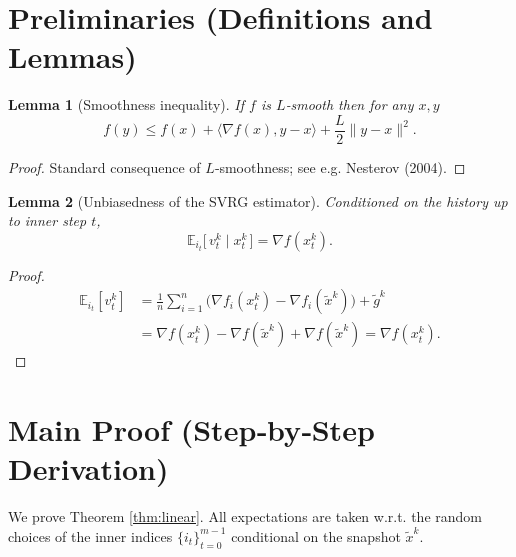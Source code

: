 \documentclass{article}
\newtheorem{lemma}{Lemma}
\begin{document}
\newpage
\section*{Preliminaries (Definitions and Lemmas)}
\begin{lemma}[Smoothness inequality]\label{lem:smooth}
If $f$ is $L$‑smooth then for any $x,y$
\[
f(y)\le f(x)+\langle\nabla f(x),y-x\rangle+\frac{L}{2}\|y-x\|^{2}.
\]
\end{lemma}
\begin{proof}
Standard consequence of $L$‑smoothness; see e.g. Nesterov (2004). \qedhere
\end{proof}

\begin{lemma}[Unbiasedness of the SVRG estimator]\label{lem:unbiased}
Conditioned on the history up to inner step $t$,
\[
\mathbb{E}_{i_t}\big[\,v_t^{k}\mid x_t^{k}\,\big]=\nabla f(x_t^{k}).
\]
\end{lemma}
\begin{proof}
\[
\begin{aligned}
\mathbb{E}_{i_t}[v_t^{k}]
&= \frac1n\sum_{i=1}^{n}\big(\nabla f_i(x_t^{k})-\nabla f_i(\tilde{x}^{k})\big)+\tilde{g}^{k}\\
&= \nabla f(x_t^{k})-\nabla f(\tilde{x}^{k})+\nabla f(\tilde{x}^{k})=\nabla f(x_t^{k}).
\end{aligned}
\] \qedhere
\end{proof}

\section*{Main Proof (Step‑by‑Step Derivation)}
We prove Theorem \ref{thm:linear}.  
All expectations are taken w.r.t. the random choices of the inner indices
$\{i_t\}_{t=0}^{m-1}$ conditional on the snapshot $\tilde{x}^{k}$.
\end{document}
